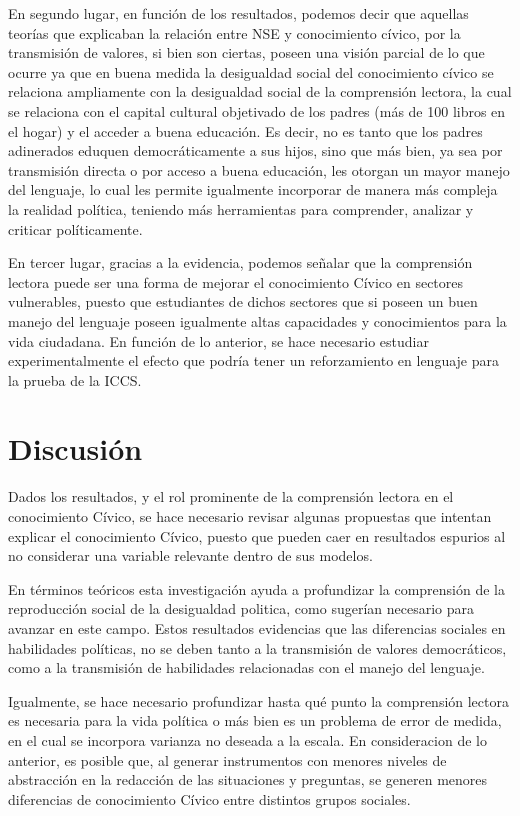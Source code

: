 \documentclass[12pt,twoside]{templates/facsothesis}
\begin{document}
En segundo lugar, en función de los resultados, podemos decir que aquellas teorías que explicaban la relación entre NSE y conocimiento cívico, por la transmisión de valores, si bien son ciertas, poseen una visión parcial de lo que ocurre ya que en buena medida la desigualdad social del conocimiento cívico se relaciona ampliamente con la desigualdad social de la comprensión lectora, la cual se relaciona con el capital cultural objetivado de los padres (más de 100 libros en el hogar) y el acceder a buena educación. Es decir, no es tanto que los padres adinerados eduquen democráticamente a sus hijos, sino que más bien, ya sea por transmisión directa o por acceso a buena educación, les otorgan un mayor manejo del lenguaje, lo cual les permite igualmente incorporar de manera más compleja la realidad política, teniendo más herramientas para comprender, analizar y criticar políticamente.

En tercer lugar, gracias a la evidencia, podemos señalar que la comprensión lectora puede ser una forma de mejorar el conocimiento Cívico en sectores vulnerables, puesto que estudiantes de dichos sectores que si poseen un buen manejo del lenguaje poseen igualmente altas capacidades y conocimientos para la vida ciudadana. En función de lo anterior, se hace necesario estudiar experimentalmente el efecto que podría tener un reforzamiento en lenguaje para la prueba de la ICCS.

\hypertarget{discusiuxf3n}{%
\section{Discusión}\label{discusiuxf3n}}

Dados los resultados, y el rol prominente de la comprensión lectora en el conocimiento Cívico, se hace necesario revisar algunas propuestas que intentan explicar el conocimiento Cívico, puesto que pueden caer en resultados espurios al no considerar una variable relevante dentro de sus modelos.

En términos teóricos esta investigación ayuda a profundizar la comprensión de la reproducción social de la desigualdad politica, como \citet{bradyPoliticalMobilityPolitical2015} sugerían necesario para avanzar en este campo. Estos resultados evidencias que las diferencias sociales en habilidades políticas, no se deben tanto a la transmisión de valores democráticos, como a la transmisión de habilidades relacionadas con el manejo del lenguaje.

Igualmente, se hace necesario profundizar hasta qué punto la comprensión lectora es necesaria para la vida política o más bien es un problema de error de medida, en el cual se incorpora varianza no deseada a la escala. En consideracion de lo anterior, es posible que, al generar instrumentos con menores niveles de abstracción en la redacción de las situaciones y preguntas, se generen menores diferencias de conocimiento Cívico entre distintos grupos sociales.
\end{document}
